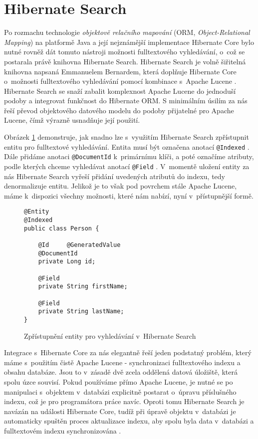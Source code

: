 \documentclass[11pt,oneside]{fithesis2}
\begin{document}
\section{Hibernate Search}
Po rozmachu technologie \emph{objektově relačního mapování} (ORM, \emph{Object-Relational Mapping}) na platformě Java a její nejznámější implementace Hibernate Core \cite[s.~29]{HibernateSearchAction} bylo nutné rovněž dát tomuto nástroji možnosti fulltextového vyhledávání, o~což se postarala právě knihovna Hibernate Search. Hibernate Search je volně šiřitelná knihovna napsaná Emmanuelem Bernardem, která doplňuje Hibernate Core o~možnosti fulltextového vyhledávání pomocí kombinace s~Apache Lucene  \cite[s.~29]{HibernateSearchAction}. Hibernate Search se snaží zabalit komplexnost Apache Lucene do jednoduší podoby a integrovat funkčnost do Hibernate ORM. S minimálním úsilím za nás řeší převod objektového datového modelu do podoby přijatelné pro Apache Lucene, čímž výrazně usnadňuje její použití.

Obrázek \ref{ExampleHibernateSearch} demonstruje, jak snadno lze s~využitím Hibernate Search zpřístupnit entitu pro fulltextové vyhledávání. Entita musí být označena anotací \texttt{@Indexed}  \cite[s.~38]{HibernateSearchAction}. Dále přidáme anotaci \texttt{@DocumentId} k~primárnímu klíči, a poté označíme atributy, podle kterých chceme vyhledávat anotací \texttt{@Field}  \cite[s.~38]{HibernateSearchAction}. V~momentě uložení entity za nás Hibernate Search vyřeší přidání uvedených atributů do indexu, tedy denormalizuje entitu. Jelikož je to však pod povrchem stále Apache Lucene, máme k~dispozici všechny možnosti, které nám nabízí, nyní v~přístupnější formě.

\begin{figure}[!htbp]
\begin{lstlisting}[frame=single]
@Entity
@Indexed
public class Person {

	@Id 	@GeneratedValue
	@DocumentId
	private Long id;

	@Field
	private String firstName;

	@Field 
	private String lastName;
}
	\end{lstlisting}
	\caption{Zpřístupnění entity pro vyhledávání v~Hibernate Search}
	\label{ExampleHibernateSearch}
\end{figure}

Integrace s~Hibernate Core za nás elegantně řeší jeden podstatný problém, který máme s~použitím čistě Apache Lucene - synchronizaci fulltextového indexu a obsahu databáze. Jsou to v~zásadě dvě zcela oddělená datová úložiště, která spolu úzce souvisí. Pokud používáme přímo Apache Lucene, je nutné se po manipulaci s~objektem v~databázi explicitně postarat o~úpravu příslušného indexu, což je pro programátora práce navíc. Oproti tomu Hibernate Search je navázán na události Hibernate Core, tudíž při úpravě objektu v~databázi je automaticky spuštěn proces aktualizace indexu, aby spolu byla data v~databázi a fulltextovém indexu synchronizována  \cite[s.~24]{HibernateSearchAction}. 
\end{document}

